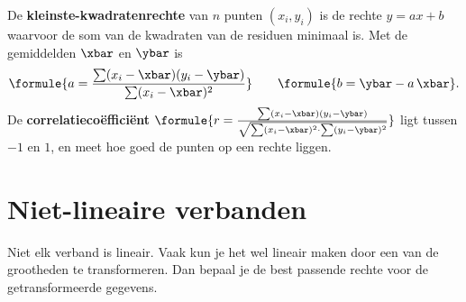 \begin{theorie}
De \textbf{\textcolor{accent}{kleinste-kwadratenrechte}} van $n$ punten $(x_i, y_i)$ is de rechte $y = ax + b$ waarvoor de som van de kwadraten van de residuen minimaal is. Met de gemiddelden $\xbar$ en $\ybar$ is
\[\formule{a = \frac{\sum (x_i - \xbar)(y_i - \ybar)}{\sum (x_i - \xbar)^2}} \qquad \formule{b = \ybar - a\,\xbar}.\]
De \textbf{\textcolor{accent}{correlatiecoëfficiënt}} $\formule{r = \frac{\sum (x_i - \xbar)(y_i - \ybar)}{\sqrt{\sum (x_i - \xbar)^2 \cdot \sum (y_i - \ybar)^2}}}$ ligt tussen $-1$ en $1$, en meet hoe goed de punten op een rechte liggen.
\end{theorie}


\begin{oefeningen}

\end{oefeningen}

\section{Niet-lineaire verbanden}

Niet elk verband is lineair. Vaak kun je het wel lineair maken door een van de grootheden te transformeren. Dan bepaal je de best passende rechte voor de getransformeerde gegevens.

